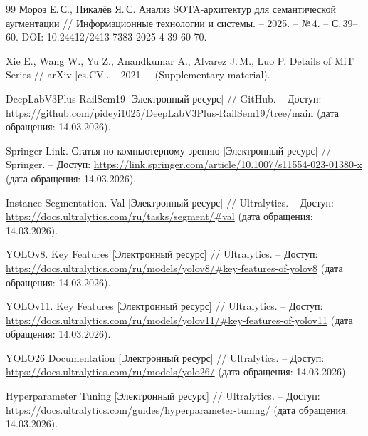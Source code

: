 \documentclass[areasetadvanced]{scrartcl}
\begin{document}
\begin{thebibliography}{99}
    Мороз Е.\,С., Пикалёв Я.\,С. Анализ SOTA-архитектур для семантической аугментации // Информационные технологии и системы. – 2025. – №\,4. – С.\,39–60. DOI: 10.24412/2413-7383-2025-4-39-60-70.

    Xie E., Wang W., Yu Z., Anandkumar A., Alvarez J.\,M., Luo P. Details of MiT Series // arXiv [cs.CV]. – 2021. – (Supplementary material).

    DeepLabV3Plus-RailSem19 [Электронный ресурс] // GitHub. – Доступ: \url{https://github.com/pideyi1025/DeepLabV3Plus-RailSem19/tree/main} (дата обращения: 14.03.2026).

    Springer Link. Статья по компьютерному зрению [Электронный ресурс] // Springer. – Доступ: \url{https://link.springer.com/article/10.1007/s11554-023-01380-x} (дата обращения: 14.03.2026).

    Instance Segmentation. Val [Электронный ресурс] // Ultralytics. – Доступ: \url{https://docs.ultralytics.com/ru/tasks/segment/#val} (дата обращения: 14.03.2026).

    YOLOv8. Key Features [Электронный ресурс] // Ultralytics. – Доступ: \url{https://docs.ultralytics.com/ru/models/yolov8/#key-features-of-yolov8} (дата обращения: 14.03.2026).

    YOLOv11. Key Features [Электронный ресурс] // Ultralytics. – Доступ: \url{https://docs.ultralytics.com/ru/models/yolov11/#key-features-of-yolov11} (дата обращения: 14.03.2026).

    YOLO26 Documentation [Электронный ресурс] // Ultralytics. – Доступ: \url{https://docs.ultralytics.com/ru/models/yolo26/} (дата обращения: 14.03.2026).

    Hyperparameter Tuning [Электронный ресурс] // Ultralytics. – Доступ: \url{https://docs.ultralytics.com/guides/hyperparameter-tuning/} (дата обращения: 14.03.2026).
\end{thebibliography}
\end{document}
